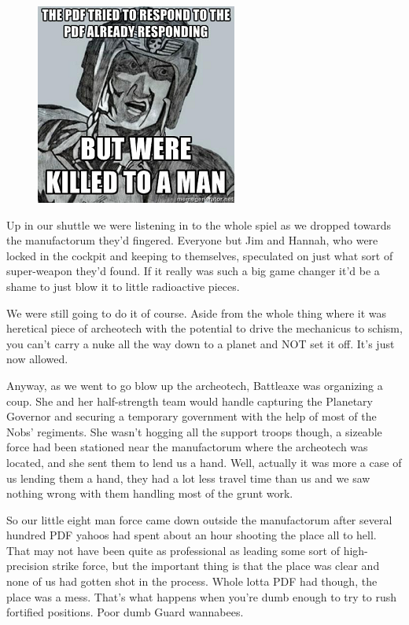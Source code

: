 \begin{figure}
	\begin{center}
		\includegraphics[width=\figwidth]{pics/11/74.png}
	\end{center}
\end{figure}
Up in our shuttle we were listening in to the whole spiel as we dropped towards the manufactorum they'd fingered. 
Everyone but Jim and Hannah, who were locked in the cockpit and keeping to themselves, speculated on just what sort of super-weapon they'd found. 
If it really was such a big game changer it'd be a shame to just blow it to little radioactive pieces.

We were still going to do it of course. 
Aside from the whole thing where it was heretical piece of archeotech with the potential to drive the mechanicus to schism, you can't carry a nuke all the way down to a planet and NOT set it off. 
It's just now allowed. 


Anyway, as we went to go blow up the archeotech, Battleaxe was organizing a coup. 
She and her half-strength team would handle capturing the Planetary Governor and securing a temporary government with the help of most of the Nobs' regiments. 
She wasn't hogging all the support troops though, a sizeable force had been stationed near the manufactorum where the archeotech was located, and she sent them to lend us a hand. 
Well, actually it was more a case of us lending them a hand, they had a lot less travel time than us and we saw nothing wrong with them handling most of the grunt work.

So our little eight man force came down outside the manufactorum after several hundred PDF yahoos had spent about an hour shooting the place all to hell. 
That may not have been quite as professional as leading some sort of high-precision strike force, but the important thing is that the place was clear and none of us had gotten shot in the process. 
Whole lotta PDF had though, the place was a mess. 
That's what happens when you're dumb enough to try to rush fortified positions. 
Poor dumb Guard wannabees.


